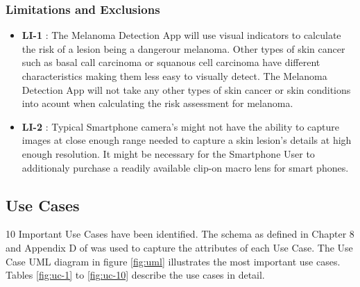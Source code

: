     \subsubsection{Limitations and Exclusions}

        \noindent
        \begin{itemize}[leftmargin=*]
            \item[]  \textbf{LI-1} : The Melanoma Detection App will use visual indicators to calculate the risk of a lesion being a dangerour melanoma. Other types of skin cancer such as basal call carcinoma or squanous cell carcinoma have different characteristics making them less easy to visually detect. The Melanoma Detection App will not take any other types of skin cancer or skin conditions into acount when calculating the risk assessment for melanoma.
            \item[]  \textbf{LI-2} : Typical Smartphone camera's might not have the ability to capture images at close enough range needed to capture a skin lesion's details at high enough resolution. It might be necessary for the Smartphone User to additionaly purchase a readily available clip-on macro lens for smart phones.

        \end{itemize}



    \subsection{Use Cases}

        10 Important Use Cases have been identified. The schema as defined in Chapter 8 and Appendix D of \cite{wiegers2013software} was used to capture the attributes of each Use Case. The Use Case UML diagram in figure \ref{fig:uml} illustrates the most important use cases. Tables \ref{fig:uc-1} to \ref{fig:uc-10} describe the use cases in detail.

